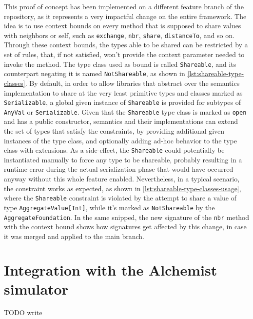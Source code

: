 This proof of concept has been implemented on a different feature branch of the repository, as it represents a very impactful change on the entire framework.
%
The idea is to use context bounds on every method that is supposed to share values with neighbors or self, such as \texttt{exchange}, \texttt{nbr}, \texttt{share}, \texttt{distanceTo}, and so on.
%
Through these context bounds, the types able to be shared can be restricted by a set of rules, that, if not satisfied, won't provide the context parameter needed to invoke the method.
%
The type class used as bound is called \texttt{Shareable}, and its counterpart negating it is named \texttt{NotShareable}, as shown in \cref{lst:shareable-type-classes}.
%
By default, in order to allow libraries that abstract over the semantics implementation to share at the very least primitive types and classes marked as \texttt{Serializable}, a global given instance of \texttt{Shareable} is provided for subtypes of \texttt{AnyVal} or \texttt{Serializable}.
%
Given that the \texttt{Shareable} type class is marked as \texttt{open} and has a public constructor, semantics and their implementations can extend the set of types that satisfy the constraints, by providing additional given instances of the type class, and optionally adding ad-hoc behavior to the type class with extensions.
%
As a side-effect, the \texttt{Shareable} could potentially be instantiated manually to force any type to be shareable, probably resulting in a runtime error during the actual serialization phase that would have occurred anyway without this whole feature enabled.
%
Nevertheless, in a typical scenario, the constraint works as expected, as shown in \cref{lst:shareable-type-classes-usage}, where the \texttt{Shareable} constraint is violated by the attempt to share a value of type \texttt{AggregateValue[Int]}, while it's marked as \texttt{NotShareable} by the \texttt{AggregateFoundation}.
%
In the same snipped, the new signature of the \texttt{nbr} method with the context bound shows how signatures get affected by this change, in case it was merged and applied to the main branch.





\section{Integration with the Alchemist simulator}

TODO write
